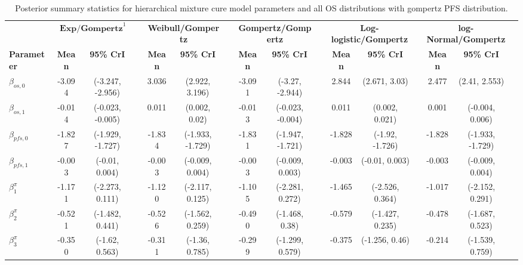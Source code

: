 \documentclass[AMA,STIX1COL]{WileyNJD-v2}
\begin{document}
\begin{landscape}
\begin{center}
\begin{table}[t]
\caption{Posterior summary statistics for hierarchical mixture cure model parameters and all OS distributions with gompertz PFS distribution. \label{tab:post_hier_pfs_gompertz}}
\centering
\begin{tabular}{l c c c c c c c c c c c c c c c}
\toprule
\multicolumn{1}{l}{} & \multicolumn{2}{c}{$\textbf{Exp/Gompertz}^1$} & & \multicolumn{2}{c}{\textbf{Weibull/Gompertz}} & & \multicolumn{2}{c}{\textbf{Gompertz/Gompertz}} & & \multicolumn{2}{c}{\textbf{Log-logistic/Gompertz}} & & \multicolumn{2}{c}{\textbf{log-Normal/Gompertz}}\\
\cmidrule{2-3}\cmidrule{5-6}\cmidrule{8-9}\cmidrule{11-12}\cmidrule{14-15}
\textbf{Parameter} & \textbf{Mean} & \textbf{95\% CrI} & & \textbf{Mean} & \textbf{95\% CrI} & & \textbf{Mean} & \textbf{95\% CrI} & & \textbf{Mean} & \textbf{95\% CrI} & & \textbf{Mean} & \textbf{95\% CrI}\\
\midrule
$\beta_{os, 0}$ & -3.094 & (-3.247, -2.956) &  & 3.036 & (2.922, 3.196) &  & -3.091 & (-3.27, -2.944) &  & 2.844 & (2.671, 3.03) &  & 2.477 & (2.41, 2.553) & \\
$\beta_{os, 1}$ & -0.014 & (-0.023, -0.005) &  & 0.011 & (0.002, 0.02) &  & -0.013 & (-0.023, -0.004) &  & 0.011 & (0.002, 0.021) &  & 0.001 & (-0.004, 0.006) & \\
$\beta_{pfs, 0}$ & -1.827 & (-1.929, -1.727) &  & -1.834 & (-1.933, -1.729) &  & -1.831 & (-1.947, -1.721) &  & -1.828 & (-1.92, -1.726) &  & -1.828 & (-1.933, -1.729) & \\
$\beta_{pfs, 1}$ & -0.003 & (-0.01, 0.004) &  & -0.003 & (-0.009, 0.004) &  & -0.003 & (-0.009, 0.003) &  & -0.003 & (-0.01, 0.003) &  & -0.003 & (-0.009, 0.004) & \\
$\beta^{\pi}_1$ & -1.171 & (-2.273, 0.111) &  & -1.120 & (-2.117, 0.125) &  & -1.105 & (-2.281, 0.272) &  & -1.465 & (-2.526, 0.364) &  & -1.017 & (-2.152, 0.291) & \\
$\beta^{\pi}_2$ & -0.521 & (-1.482, 0.441) &  & -0.526 & (-1.562, 0.259) &  & -0.490 & (-1.468, 0.38) &  & -0.579 & (-1.427, 0.235) &  & -0.478 & (-1.687, 0.523) & \\
$\beta^{\pi}_3$ & -0.350 & (-1.62, 0.563) &  & -0.311 & (-1.36, 0.785) &  & -0.299 & (-1.299, 0.579) &  & -0.375 & (-1.256, 0.46) &  & -0.214 & (-1.539, 0.759) & \\

\end{tabular}
\end{table}
\end{center}
\end{landscape}
\end{document}

